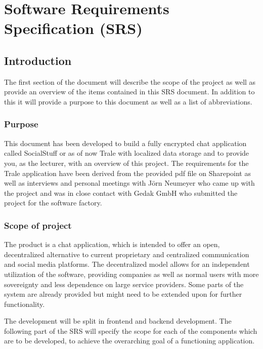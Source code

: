 

\chapter{Software Requirements Specification (SRS)}\label{ch:software-requirements-specification-(srs)}


\section{Introduction}\label{sec:introduction}
The first section of the document will describe the scope of the project as well as provide an overview of the items
contained in this SRS document.
In addition to this it will provide a purpose to this document as well as a list of abbreviations.

\subsection{Purpose}\label{subsec:purpose}
This document has been developed to build a fully encrypted chat application called SocialStuff or as of now Trale with
localized data storage and to provide you, as the lecturer, with an overview of this project.
The requirements for the Trale application have been derived from the provided pdf file on Sharepoint as well as
interviews and personal meetings with J\"orn Neumeyer who came up with the project and was in close contact with Gedak
GmbH who submitted the project for the software factory.

\subsection{Scope of project}\label{subsec:scope-of-project}
The product is a chat application, which is intended to offer an open, decentralized alternative to current proprietary
and centralized communication and social media platforms.
The decentralized model allows for an independent utilization of the software, providing companies as well as normal
users with more sovereignty and less dependence on large service providers.
Some parts of the system are already provided but might need to be extended upon for further functionality.

The development will be split in frontend and backend development.
The following part of the SRS will specify the scope for each of the components which are to be developed, to achieve
the overarching goal of a functioning application.

